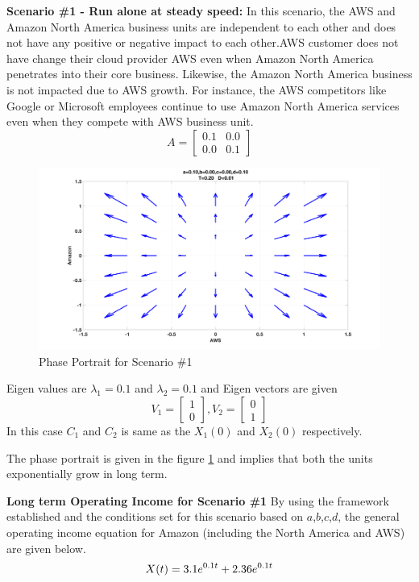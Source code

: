 \documentclass[fleqn,10pt]{SelfArx} %
\begin{document}
\textbf{Scenario \#1 - Run alone at steady speed:}
In this scenario, the AWS and Amazon North America business units are independent to each other and does not have any positive or negative impact to each other.AWS customer does not have change their cloud provider AWS even when Amazon North America penetrates into their core business. Likewise, the Amazon North America business is not impacted due to AWS growth. For instance, the AWS competitors like Google or Microsoft employees continue to use Amazon North America services even when they compete with AWS business unit.
\[
A =
\begin{bmatrix}
0.1 & 0.0 \\
0.0 & 0.1
\end{bmatrix}
\]
\begin{figure}[ht]\centering
\includegraphics[width=\linewidth]{scen1}
\caption{Phase Portrait for Scenario \#1}
\label{fig:scen1}
\end{figure}  
Eigen values are $\lambda_1 = 0.1$ and $\lambda_2 = 0.1$ and Eigen vectors are given 
\[
V_1 =
\begin{bmatrix}
1  \\
0 
\end{bmatrix}
,V_2 =
\begin{bmatrix}
0  \\
1 
\end{bmatrix}
\]
In this case $C_1$ and $C_2$ is same as the $X_1(0)$ and $X_2(0)$ respectively. 

The phase portrait is given in the figure \ref{fig:scen1} and implies that both the units exponentially grow in long term. 

\textbf{Long term Operating Income for Scenario \#1}
By using the framework established and the conditions set for this scenario based on $a$,$b$,$c$,$d$, the general operating income equation for Amazon (including the North America and AWS) are given below. 
\begin{equation} \centering
X(t) = 3.1 e^{0.1 t} + 2.36 e^{0.1 t}
\label{eq:s1}
\end{equation}
\end{document}
